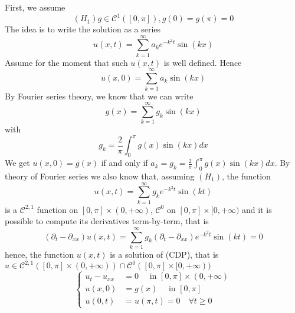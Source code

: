 \begin{enumerate}
\begin{itemize}
        First, we assume 
        \begin{equation*}
            (H_1) g \in \mathcal{C}^1([0,\pi]), g(0) = g(\pi) = 0
        \end{equation*}
        The idea is to write the solution as a series 
        \begin{equation*}
            u(x,t) = \sum_{k=1}^\infty a_k e^{-k^2 t} \sin(kx)
        \end{equation*}
        Assume for the moment that such $u(x,t)$ is well defined. Hence
        \begin{equation*}
            u(x,0) = \sum_{k=1}^\infty a_k \sin(kx)
        \end{equation*}
        By Fourier series theory, we know that we can write
        \begin{equation*}
            g(x) = \sum_{k=1}^\infty g_k \sin(kx)
        \end{equation*}
        with
        \begin{equation*}
            g_k= \frac{2}{\pi} \int_0^\pi g(x) \sin(kx) dx
        \end{equation*}
        We get $u(x,0) = g(x)$ if and only if $a_k = g_k = \frac{2}{\pi} \int_0^\pi g(x) \sin(kx) dx$. By theory of Fourier series we also know that, assuming $(H_1)$, the function 
        \begin{equation*}
            u(x,t) = \sum_{k=1}^\infty g_k e^{-k^2 t} \sin(kt)
        \end{equation*}
        is a $\mathcal{C}^{2,1}$ function on $[0,\pi] \times (0,+\infty)$, $\mathcal{C}^0$ on $[0,\pi] \times [0,+\infty)$ and it is possible to compute its derivatives term-by-term, that is 
        \begin{equation*}
            (\partial_t-\partial_{xx})u(x,t) = \sum_{k=1}^\infty g_k (\partial_t - \partial_{xx}) e^{-k^2t} \sin(kt) = 0
        \end{equation*}
        hence, the function $u(x,t)$ is a solution of (CDP), that is $u \in \mathcal{C}^{2,1}([0,\pi] \times (0,+\infty)) \cap \mathcal{C}^0([0,\pi] \times [0,+\infty))$
        \begin{equation*}
            \begin{cases}
            u_t - u_{xx} &= 0 \quad \text{ in } [0,\pi] \times (0,+\infty)\\
            u(x,0) &= g(x) \quad \text{ in } [0,\pi] \\
            u(0,t) &= u(\pi,t) = 0 \quad \forall t \geq 0
            \end{cases}

\end{equation*}
\end{itemize}
\end{enumerate}
